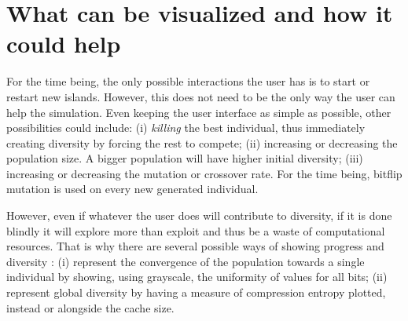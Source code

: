 \documentclass{sig-alternate}
\begin{document}


\section{What can be visualized and how it could help}
\label{sec:conclusion}

For the time being, the only possible interactions the user has is to start  or
restart new islands. However, this does not need to be the only way the user 
can help the simulation. Even keeping the user interface as simple as
possible, other possibilities could include: (i) {\em killing} the best individual, thus immediately creating
  diversity by forcing the rest to compete; (ii) increasing or decreasing the population size. A bigger
  population will have higher initial diversity; (iii) increasing or decreasing the mutation or crossover rate. For the time being,
  bitflip mutation is used on every new generated individual. 

However, even if whatever the user does will contribute to diversity,
if it is done blindly it will explore more than exploit and thus be a
waste of computational resources. That is why there are several
possible ways of showing progress and diversity%
: (i) represent the convergence of the population towards a single
  individual by showing, using grayscale, the uniformity of values for
  all bits; %
(ii) represent global diversity by having a measure of compression
  entropy plotted, instead or alongside the cache size.
\end{document}
